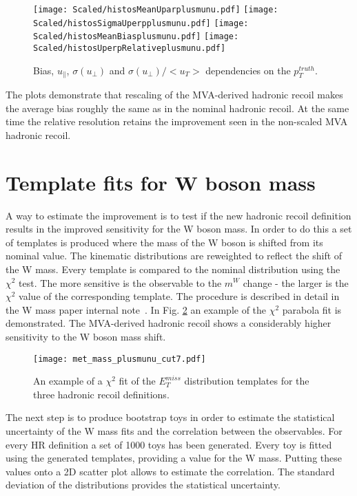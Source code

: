 \begin{figure}[tph]
	\centering
	\texttt{[image: Scaled/histosMeanUparplusmunu.pdf]}%
	\texttt{[image: Scaled/histosSigmaUperpplusmunu.pdf]}
	\texttt{[image: Scaled/histosMeanBiasplusmunu.pdf]}%
	\texttt{[image: Scaled/histosUperpRelativeplusmunu.pdf]}
	\caption{Bias, $u_{\parallel}$, $\sigma(u_{\perp})$ and $\sigma(u_{\perp})/<u_T>$ dependencies on the $p_T^{truth}$.}
	\label{fig:mva_scaled_mean}
\end{figure}
The plots demonstrate that rescaling of the MVA-derived hadronic recoil makes the average bias roughly the same as in the nominal hadronic recoil. At the same time the relative resolution retains the improvement seen in the non-scaled MVA hadronic recoil.
\clearpage
\section{Template fits for W boson mass}
A way to estimate the improvement is to test if the new hadronic recoil definition results in the improved sensitivity for the W boson mass. In order to do this a set of templates is produced where the mass of the W boson is shifted from its nominal value. The kinematic distributions are reweighted to reflect the shift of the W mass. 
Every template is compared to the nominal distribution using the $\chi^2$ test. The more sensitive is the observable to the $m^W$ change - the larger is the $\chi^2$ value of the corresponding template. The procedure is described in detail in the W mass paper internal note~\cite{Wmass7TeVIntNote}. In Fig. \ref{fig:chi2_parabola} an example of the $\chi^2$ parabola fit is demonstrated. The MVA-derived hadronic recoil shows a considerably higher sensitivity to the W boson mass shift. 
\begin{figure}[tph]
	\centering
	\texttt{[image: met\_mass\_plusmunu\_cut7.pdf]}
	\caption{An example of a $\chi^2$ fit of the $E_T^{miss}$ distribution templates for the three hadronic recoil definitions.}
	\label{fig:chi2_parabola}
\end{figure}

The next step is to produce bootstrap toys in order to estimate the statistical uncertainty of the W mass fits and the correlation between the observables. For every HR definition a set of 1000 toys has been generated. Every toy is fitted using the generated templates, providing a value for the W mass. Putting these values onto a 2D scatter plot allows to estimate the correlation. The standard deviation of the distributions provides the statistical uncertainty.

